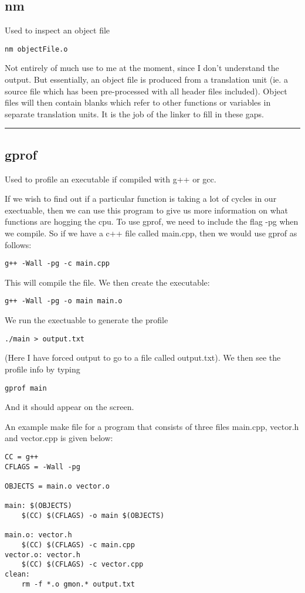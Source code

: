\documentclass[a4paper, 10pt]{article}
\newcommand{\mybotrule}{\vspace{4mm}\hrule}
\begin{document}
\subsection*{nm}
Used to inspect an object file
\begin{verbatim}
nm objectFile.o
\end{verbatim}
Not entirely of much use to me at the moment, since I don't understand the output. But essentially, an object file is produced from a translation unit (ie. a source file which has been pre-processed with all header files included). Object files will then contain blanks which refer to other functions or variables in separate translation units. It is the job of the linker to fill in these gaps. 
\mybotrule

\subsection*{gprof}
Used to profile an executable if compiled with g++ or gcc.

If we wish to find out if a particular function is taking a lot of cycles in our exectuable, then we can use this program to give us more information on what functions are hogging the cpu. To use gprof, we need to include the flag -pg when we compile. So if we have a c++ file called main.cpp, then we would use gprof as follows:
\begin{verbatim}
g++ -Wall -pg -c main.cpp 
\end{verbatim}
This will compile the file. We then create the executable:
\begin{verbatim}
g++ -Wall -pg -o main main.o
\end{verbatim}
We run the exectuable to generate the profile
\begin{verbatim}
./main > output.txt
\end{verbatim}
(Here I have forced output to go to a file called output.txt). We then see the profile info by typing
\begin{verbatim}
gprof main
\end{verbatim}
And it should appear on the screen.

An example make file for a program that consists of three files main.cpp, vector.h and vector.cpp is given below:

\begin{verbatim}
CC = g++
CFLAGS = -Wall -pg

OBJECTS = main.o vector.o

main: $(OBJECTS)
	$(CC) $(CFLAGS) -o main $(OBJECTS)

main.o: vector.h
	$(CC) $(CFLAGS) -c main.cpp
vector.o: vector.h
	$(CC) $(CFLAGS) -c vector.cpp
clean:
	rm -f *.o gmon.* output.txt
\end{verbatim}
\end{document}
